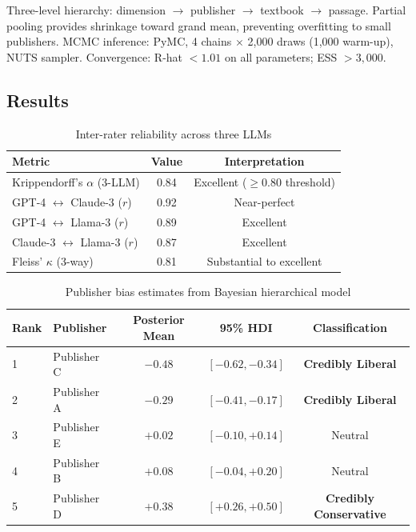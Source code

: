 \documentclass[11pt,a4paper]{article}
\begin{document}
Three-level hierarchy: dimension $\to$ publisher $\to$ textbook $\to$ passage. Partial pooling provides shrinkage toward grand mean, preventing overfitting to small publishers. MCMC inference: PyMC, 4 chains $\times$ 2,000 draws (1,000 warm-up), NUTS sampler. Convergence: R-hat $< 1.01$ on all parameters; ESS $> 3,000$.

\subsection{Results}

\begin{table}[H]
\centering
\caption{Inter-rater reliability across three LLMs}
\begin{tabular}{lcc}
\toprule
\textbf{Metric} & \textbf{Value} & \textbf{Interpretation} \\
\midrule
Krippendorff's $\alpha$ (3-LLM) & 0.84 & Excellent ($\geq 0.80$ threshold) \\
GPT-4 $\leftrightarrow$ Claude-3 ($r$) & 0.92 & Near-perfect \\
GPT-4 $\leftrightarrow$ Llama-3 ($r$) & 0.89 & Excellent \\
Claude-3 $\leftrightarrow$ Llama-3 ($r$) & 0.87 & Excellent \\
Fleiss' $\kappa$ (3-way) & 0.81 & Substantial to excellent \\
\bottomrule
\end{tabular}
\label{tab:llm_reliability}
\end{table}

\begin{table}[H]
\centering
\caption{Publisher bias estimates from Bayesian hierarchical model}
\begin{tabular}{llccc}
\toprule
\textbf{Rank} & \textbf{Publisher} & \textbf{Posterior Mean} & \textbf{95\% HDI} & \textbf{Classification} \\
\midrule
1 & Publisher C & $-0.48$ & $[-0.62, -0.34]$ & \textbf{Credibly Liberal} \\
2 & Publisher A & $-0.29$ & $[-0.41, -0.17]$ & \textbf{Credibly Liberal} \\
3 & Publisher E & $+0.02$ & $[-0.10, +0.14]$ & Neutral \\
4 & Publisher B & $+0.08$ & $[-0.04, +0.20]$ & Neutral \\
5 & Publisher D & $+0.38$ & $[+0.26, +0.50]$ & \textbf{Credibly Conservative} \\
\bottomrule
\end{tabular}
\label{tab:publisher_bias}
\end{table}
\end{document}
